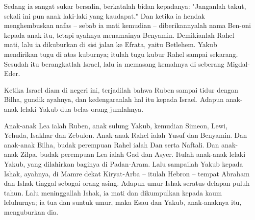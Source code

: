 \begin{biblechapter}
\verse Sedang ia sangat sukar bersalin, berkatalah bidan kepadanya: "Janganlah takut, sekali ini pun anak laki-laki yang kaudapat."
\verse Dan ketika ia hendak menghembuskan nafas -- sebab ia mati kemudian -- diberikannyalah nama Ben-oni kepada anak itu, tetapi ayahnya menamainya Benyamin.
\verse Demikianlah Rahel mati, lalu ia dikuburkan di sisi jalan ke Efrata, yaitu Betlehem.
\verse Yakub mendirikan tugu di atas kuburnya; itulah tugu kubur Rahel sampai sekarang.
\verse Sesudah itu berangkatlah Israel, lalu ia memasang kemahnya di seberang Migdal-Eder.
\begin{partedverse}
\versepart Ketika Israel diam di negeri ini, terjadilah bahwa Ruben sampai tidur dengan Bilha, gundik ayahnya, dan kedengaranlah hal itu kepada Israel.
 Adapun anak-anak lelaki Yakub dua belas orang jumlahnya.
\end{partedverse}
\verse Anak-anak Lea ialah Ruben, anak sulung Yakub, kemudian Simeon, Lewi, Yehuda, Isakhar dan Zebulon.
\verse Anak-anak Rahel ialah Yusuf dan Benyamin.
\verse Dan anak-anak Bilha, budak perempuan Rahel ialah Dan serta Naftali.
\verse Dan anak-anak Zilpa, budak perempuan Lea ialah Gad dan Asyer. Itulah anak-anak lelaki Yakub, yang dilahirkan baginya di Padan-Aram.
\verse Lalu sampailah Yakub kepada Ishak, ayahnya, di Mamre dekat Kiryat-Arba -- itulah Hebron -- tempat Abraham dan Ishak tinggal sebagai orang asing.
\verse Adapun umur Ishak seratus delapan puluh tahun.
\verse Lalu meninggallah Ishak, ia mati dan dikumpulkan kepada kaum leluhurnya; ia tua dan suntuk umur, maka Esau dan Yakub, anak-anaknya itu, menguburkan dia.
\end{biblechapter}

